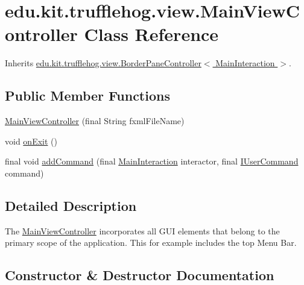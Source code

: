 \hypertarget{classedu_1_1kit_1_1trufflehog_1_1view_1_1_main_view_controller}{}\section{edu.\+kit.\+trufflehog.\+view.\+Main\+View\+Controller Class Reference}
\label{classedu_1_1kit_1_1trufflehog_1_1view_1_1_main_view_controller}


Inherits \hyperlink{classedu_1_1kit_1_1trufflehog_1_1view_1_1_border_pane_controller}{edu.\+kit.\+trufflehog.\+view.\+Border\+Pane\+Controller$<$ Main\+Interaction $>$}.

\subsection*{Public Member Functions}
\begin{DoxyCompactItemize}
\item 
\hyperlink{classedu_1_1kit_1_1trufflehog_1_1view_1_1_main_view_controller_abf6876980a68e2598d8292bb2c496f2a}{Main\+View\+Controller} (final String fxml\+File\+Name)
\item 
void \hyperlink{classedu_1_1kit_1_1trufflehog_1_1view_1_1_main_view_controller_aec3b2b25eda1138a361d7c385797978b}{on\+Exit} ()
\item 
final void \hyperlink{classedu_1_1kit_1_1trufflehog_1_1view_1_1_main_view_controller_a83405374417c2dd939c154a665c665e1}{add\+Command} (final \hyperlink{enumedu_1_1kit_1_1trufflehog_1_1interaction_1_1_main_interaction}{Main\+Interaction} interactor, final \hyperlink{interfaceedu_1_1kit_1_1trufflehog_1_1command_1_1usercommand_1_1_i_user_command}{I\+User\+Command} command)
\end{DoxyCompactItemize}


\subsection{Detailed Description}
The \hyperlink{classedu_1_1kit_1_1trufflehog_1_1view_1_1_main_view_controller}{Main\+View\+Controller} incorporates all G\+U\+I elements that belong to the primary scope of the application. This for example includes the top Menu Bar. 

\subsection{Constructor \& Destructor Documentation}
\hypertarget{classedu_1_1kit_1_1trufflehog_1_1view_1_1_main_view_controller_abf6876980a68e2598d8292bb2c496f2a}{}
